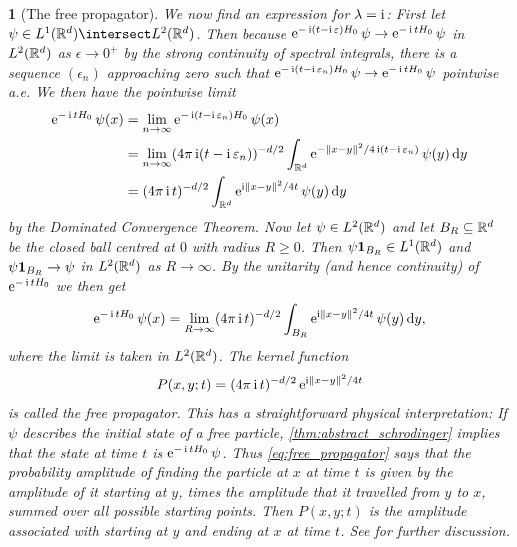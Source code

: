 \documentclass[article, a4paper, 11pt, oneside]{memoir}
\makeatletter
\numberwithin{equation}{chapter}
\theoremstyle{myexample}
\theoremstyle{myexample}
\theoremstyle{myexamplebreak}
\theoremstyle{myexamplebreak}
\newtheorem{examplebreak}[theorem]{\protect\@example}
\theoremstyle{nonumberplain}
\theoremstyle{MyNonumberplain}
\newcommand{\@example}{}
\renewcommand{\@example}{Example}%
\renewcommand{\@example}{Eksempel}%
\makeatother
\begin{document}
\begin{examplebreak}[The free propagator]
    We now find an expression for $\lambda = \operatorname{i}$: First let $\psi \in L^1(\setR^d) \intersect L^2(\setR^d)$. Then because $\operatorname{\mathrm{e}}^{- \operatorname{i} (t - \operatorname{i} \varepsilon)H_0} \psi \to \operatorname{\mathrm{e}}^{- \operatorname{i} tH_0} \psi$ in $L^2(\mathbb{R}^d)$ as $\epsilon \to 0^+$ by the strong continuity of spectral integrals, there is a sequence $(\epsilon_n)$ approaching zero such that $\operatorname{\mathrm{e}}^{- \operatorname{i} (t - \operatorname{i} \varepsilon_n)H_0} \psi \to \operatorname{\mathrm{e}}^{- \operatorname{i} tH_0} \psi$ pointwise a.e. We then have the pointwise limit
    \begin{align*}
        \operatorname{\mathrm{e}}^{- \operatorname{i} tH_0} \psi(x)
            &= \lim_{n \to \infty} \operatorname{\mathrm{e}}^{- \operatorname{i} (t - \operatorname{i} \varepsilon_n)H_0} \psi(x) \\
            &= \lim_{n \to \infty} (4\pi \operatorname{i} (t - \operatorname{i} \varepsilon_n))^{-d/2} \int_{\mathbb{R}^d} \operatorname{\mathrm{e}}^{-\lVert x-y\rVert^2/4\operatorname{i} (t - \operatorname{i} \varepsilon_n)} \psi(y) \mathop{}\!\mathrm{d} y \\
            &= (4\pi \operatorname{i} t)^{-d/2} \int_{\mathbb{R}^d} \operatorname{\mathrm{e}}^{\operatorname{i} \lVert x-y\rVert^2/4t} \psi(y) \mathop{}\!\mathrm{d} y
    \end{align*}
    by the Dominated Convergence Theorem. Now let $\psi \in L^2(\mathbb{R}^d)$ and let $B_R \subseteq \mathbb{R}^d$ be the closed ball centred at $0$ with radius $R \geq 0$. Then $\psi \mathbf{1}_{B_R} \in L^1(\mathbb{R}^d)$ and $\psi \mathbf{1}_{B_R} \to \psi$ in $L^2(\mathbb{R}^d)$ as $R \to \infty$. By the unitarity (and hence continuity) of $\operatorname{\mathrm{e}}^{- \operatorname{i} tH_0}$ we then get
    \begin{equation*}
        \operatorname{\mathrm{e}}^{- \operatorname{i} tH_0} \psi(x)
            = \lim_{R \to \infty} (4\pi \operatorname{i} t)^{-d/2} \int_{B_R} \operatorname{\mathrm{e}}^{\operatorname{i} \lVert x-y\rVert^2/4t} \psi(y) \mathop{}\!\mathrm{d} y,
    \end{equation*}
    where the limit is taken in $L^2(\mathbb{R}^d)$. The kernel function
    \begin{equation}
        \label{eq:free_propagator}
        P(x,y;t) = (4\pi \operatorname{i} t)^{-d/2} \operatorname{\mathrm{e}}^{\operatorname{i} \lVert x-y\rVert^2/4t}
    \end{equation}
    is called the \emph{free propagator}. This has a straightforward physical interpretation: If $\psi$ describes the initial state of a free particle, \cref{thm:abstract_schrodinger} implies that the state at time $t$ is $\operatorname{\mathrm{e}}^{-\operatorname{i} t H_0} \psi$. Thus \eqref{eq:free_propagator} says that the probability amplitude of finding the particle at $x$ at time $t$ is given by the amplitude of it starting at $y$, times the amplitude that it travelled from $y$ to $x$, summed over all possible starting points. Then $P(x,y;t)$ is the amplitude associated with starting at $y$ and ending at $x$ at time $t$. See \textcite[Section~2.6]{sakurai2011} for further discussion.
\end{examplebreak}
\end{document}

